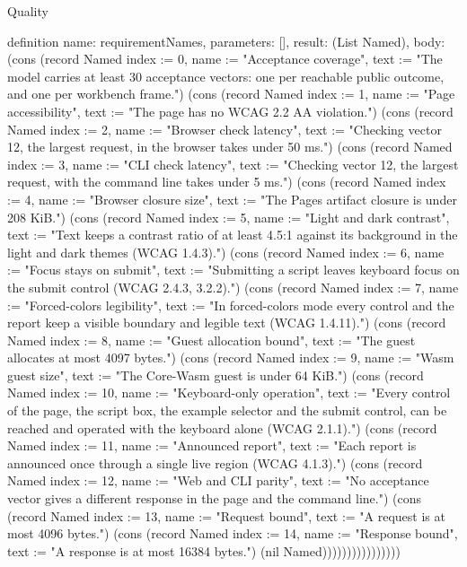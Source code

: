 \begin{lexlean}{Quality}
\begin{semanticmodule}
definition{
  name: requirementNames,
  parameters: [],
  result: (List Named),
  body: (cons (record Named {index := 0, name := "Acceptance coverage", text := "The model carries at least 30 acceptance vectors: one per reachable public outcome, and one per workbench frame."}) (cons (record Named {index := 1, name := "Page accessibility", text := "The page has no WCAG 2.2 AA violation."}) (cons (record Named {index := 2, name := "Browser check latency", text := "Checking vector 12, the largest request, in the browser takes under 50 ms."}) (cons (record Named {index := 3, name := "CLI check latency", text := "Checking vector 12, the largest request, with the command line takes under 5 ms."}) (cons (record Named {index := 4, name := "Browser closure size", text := "The Pages artifact closure is under 208 KiB."}) (cons (record Named {index := 5, name := "Light and dark contrast", text := "Text keeps a contrast ratio of at least 4.5:1 against its background in the light and dark themes (WCAG 1.4.3)."}) (cons (record Named {index := 6, name := "Focus stays on submit", text := "Submitting a script leaves keyboard focus on the submit control (WCAG 2.4.3, 3.2.2)."}) (cons (record Named {index := 7, name := "Forced-colors legibility", text := "In forced-colors mode every control and the report keep a visible boundary and legible text (WCAG 1.4.11)."}) (cons (record Named {index := 8, name := "Guest allocation bound", text := "The guest allocates at most 4097 bytes."}) (cons (record Named {index := 9, name := "Wasm guest size", text := "The Core-Wasm guest is under 64 KiB."}) (cons (record Named {index := 10, name := "Keyboard-only operation", text := "Every control of the page, the script box, the example selector and the submit control, can be reached and operated with the keyboard alone (WCAG 2.1.1)."}) (cons (record Named {index := 11, name := "Announced report", text := "Each report is announced once through a single live region (WCAG 4.1.3)."}) (cons (record Named {index := 12, name := "Web and CLI parity", text := "No acceptance vector gives a different response in the page and the command line."}) (cons (record Named {index := 13, name := "Request bound", text := "A request is at most 4096 bytes."}) (cons (record Named {index := 14, name := "Response bound", text := "A response is at most 16384 bytes."}) (nil Named))))))))))))))))
}


\end{semanticmodule}
\end{lexlean}

